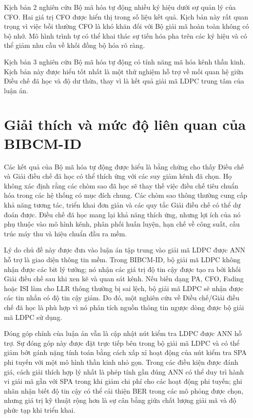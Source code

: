 Kịch bản 2 nghiên cứu Bộ mã hóa tự động nhiều ký hiệu dưới sự quản lý của CFO. Hai giá trị CFO được hiển thị trong số liệu kết quả. Kịch bản này rất quan trọng vì việc bồi thường CFO là khó khăn đối với Bộ giải mã hoàn toàn không có bộ nhớ. Mô hình trình tự có thể khai thác sự tiến hóa pha trên các ký hiệu và có thể giảm nhu cầu về khối đồng bộ hóa rõ ràng.

Kịch bản 3 nghiên cứu Bộ mã hóa tự động có tính năng mã hóa kênh thần kinh. Kịch bản này được hiểu tốt nhất là một thử nghiệm hỗ trợ về mối quan hệ giữa Điều chế đã học và độ dư thừa, thay vì là kết quả giải mã LDPC trung tâm của luận án.




\section{Giải thích và mức độ liên quan của BIBCM-ID}
Các kết quả của Bộ mã hóa tự động được hiểu là bằng chứng cho thấy Điều chế và Giải điều chế đã học có thể thích ứng với các suy giảm kênh đã chọn. Họ không xác định rằng các chòm sao đã học sẽ thay thế việc điều chế tiêu chuẩn hóa trong các hệ thống có mục đích chung. Các chòm sao thông thường cung cấp khả năng tương tác, triển khai đơn giản và các quy tắc Giải điều chế có thể dự đoán được. Điều chế đã học mang lại khả năng thích ứng, nhưng lợi ích của nó phụ thuộc vào mô hình kênh, phân phối huấn luyện, hạn chế về công suất, cấu trúc máy thu và hiệu chuẩn đầu ra mềm.

Lý do chủ đề này được đưa vào luận án tập trung vào giải mã LDPC được ANN hỗ trợ là giao diện thông tin mềm. Trong BIBCM-ID, bộ giải mã LDPC không nhận được các bit lý tưởng; nó nhận các giá trị độ tin cậy được tạo ra bởi khối Giải điều chế sau khi xen kẽ và quan sát kênh. Nếu biến dạng PA, CFO, Fading hoặc ISI làm cho LLR thông thường bị sai lệch, bộ giải mã LDPC sẽ nhận được các tin nhắn có độ tin cậy giảm. Do đó, một nghiên cứu về Điều chế/Giải điều chế đã học là phù hợp vì nó phân tích nguồn thông tin ngược dòng được bộ giải mã LDPC sử dụng.

Đóng góp chính của luận án vẫn là cập nhật nút kiểm tra LDPC được ANN hỗ trợ. Sự đóng góp này được đặt trực tiếp bên trong bộ giải mã LDPC và có thể giảm bớt gánh nặng tính toán bằng cách xấp xỉ hoạt động của nút kiểm tra SPA phi tuyến với một mô hình thần kinh nhỏ gọn. Trong các điều kiện được đánh giá, cách giải thích hợp lý nhất là phép tính gần đúng ANN có thể duy trì hành vi giải mã gần với SPA trong khi giảm chi phí cho các hoạt động phi tuyến; ghi nhãn nhận biết độ tin cậy có thể cải thiện BER trong các mô phỏng được chọn, nhưng giá trị kỹ thuật rộng hơn là sự cân bằng giữa chất lượng giải mã và độ phức tạp khi triển khai.

